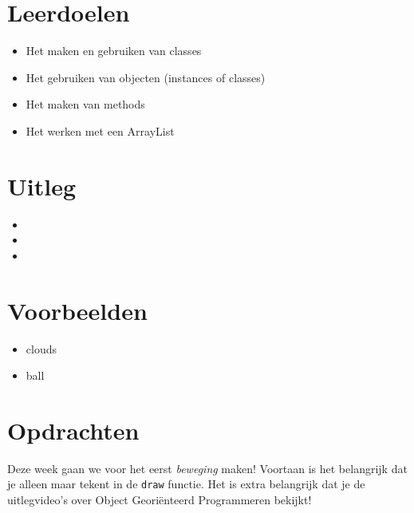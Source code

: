 \documentclass[../syllabus.tex]{subfiles}
\begin{document}
\section{Leerdoelen}
\begin{itemize}
    \item Het maken en gebruiken van classes
    \item Het gebruiken van objecten (instances of classes)
    \item Het maken van methods
    \item Het werken met een ArrayList
\end{itemize}

\section{Uitleg}
\begin{itemize}
    \item {}
    \item {}
    \item {}
\end{itemize}

\section{Voorbeelden}
\begin{itemize}
    \item clouds
    \item ball
\end{itemize}

\newpage
\section{Opdrachten}
Deze week gaan we voor het eerst \textit{beweging} maken! Voortaan is het belangrijk dat je alleen maar tekent in de \texttt{draw} functie. Het is extra belangrijk dat je de uitlegvideo's over Object Geori\"enteerd Programmeren bekijkt!
\end{document}
